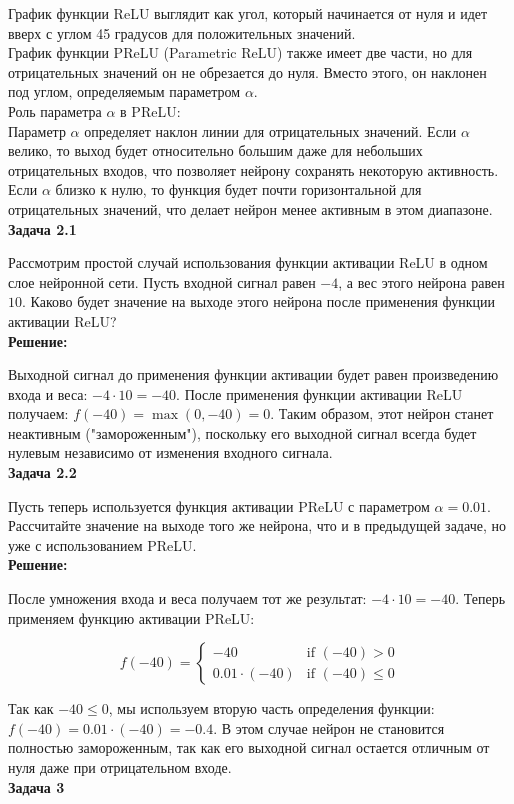 График функции ReLU выглядит как угол, который начинается от нуля и идет вверх с углом 45 градусов для положительных значений.\\
График функции PReLU (Parametric ReLU) также имеет две части, но для отрицательных значений он не обрезается до нуля. Вместо этого, он наклонен под углом, определяемым параметром $\alpha$. \\
Роль параметра $\alpha$ в PReLU:\\
Параметр $\alpha$ определяет наклон линии для отрицательных значений. Если $\alpha$ велико, то выход будет относительно большим даже для небольших отрицательных входов, что позволяет нейрону сохранять некоторую активность. Если $\alpha$ близко к нулю, то функция будет почти горизонтальной для отрицательных значений, что делает нейрон менее активным в этом диапазоне.\\
\textbf{Задача 2.1}

Рассмотрим простой случай использования функции активации ReLU в одном слое нейронной сети. Пусть входной сигнал равен $-4$, а вес этого нейрона равен $10$. Каково будет значение на выходе этого нейрона после применения функции активации ReLU?\\
\textbf{Решение:}

Выходной сигнал до применения функции активации будет равен произведению входа и веса: $-4 \cdot 10 = -40$. После применения функции активации ReLU получаем: $f(-40) = \max(0, -40) = 0$. Таким образом, этот нейрон станет неактивным ("замороженным"), поскольку его выходной сигнал всегда будет нулевым независимо от изменения входного сигнала.\\
\textbf{Задача 2.2}

Пусть теперь используется функция активации PReLU с параметром $\alpha = 0.01$. Рассчитайте значение на выходе того же нейрона, что и в предыдущей задаче, но уже с использованием PReLU.\\
\textbf{Решение:}

После умножения входа и веса получаем тот же результат: $-4 \cdot 10 = -40$. Теперь применяем функцию активации PReLU:

$$ f(-40) = \begin{cases}
-40 & \text{if } (-40) > 0 \\
0.01 \cdot (-40) & \text{if } (-40) \leq 0
\end{cases} $$

Так как $-40 \leq 0$, мы используем вторую часть определения функции: $f(-40) = 0.01 \cdot (-40) = -0.4$. В этом случае нейрон не становится полностью замороженным, так как его выходной сигнал остается отличным от нуля даже при отрицательном входе.\\
\textbf{Задача 3}

